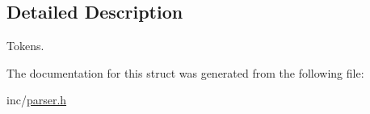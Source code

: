 \begin{DoxyCompactItemize}
\end{DoxyCompactItemize}


\subsection{Detailed Description}
Tokens. 

The documentation for this struct was generated from the following file\+:\begin{DoxyCompactItemize}
\item 
inc/\hyperlink{parser_8h}{parser.\+h}\end{DoxyCompactItemize}
